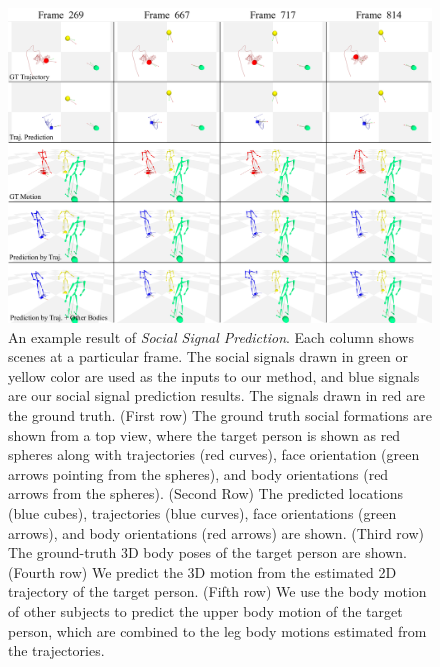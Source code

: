 

\begin{figure}
	\centering       
	\includegraphics[width=\linewidth]{ssp_fig/qual_170221_b2_group4}
	\caption{An example result of \textit{Social Signal Prediction}. Each column shows scenes at a particular frame. The social signals drawn in green or yellow color are used as the inputs to our method, and blue signals are our social signal prediction results. The signals drawn in red are the ground truth. (First row) The ground truth social formations are shown from a top view, where the target person is shown as red spheres along with trajectories (red curves), face orientation (green arrows pointing from the spheres), and body orientations (red arrows from the spheres). (Second Row) The predicted locations (blue cubes), trajectories (blue curves), face orientations (green arrows), and body orientations (red arrows) are shown. (Third row) The ground-truth 3D body poses of the target person are shown. (Fourth row) We predict the 3D motion from the estimated 2D trajectory of the target person. (Fifth row) We use the body motion of other subjects to predict the upper body motion of the target person, which are combined to the leg body motions estimated from the trajectories.} 
	\label{fig:qualitative}
\end{figure}

